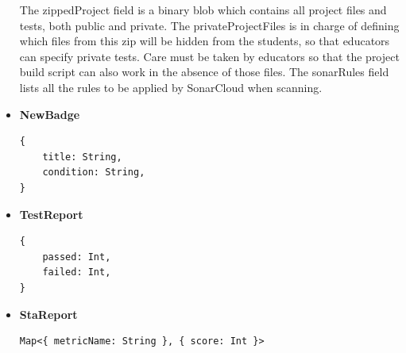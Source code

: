\begin{itemize}
          The zippedProject field is a binary blob which contains all project files and tests, both public and private.
          The privateProjectFiles is in charge of defining which files from this zip will be hidden from the students,
          so that educators can specify private tests. Care must be taken by educators so that the project build script
          can also work in the absence of those files. The sonarRules field lists all the rules to be applied by
          SonarCloud when scanning.
    \item \textbf{NewBadge}
          \begin{lstlisting}
{
    title: String,
    condition: String,
} 
          \end{lstlisting}
    \item \textbf{TestReport}
          \begin{lstlisting}
{
    passed: Int,
    failed: Int,
} 
          \end{lstlisting}
    \item \textbf{StaReport}
          \begin{lstlisting}
Map<{ metricName: String }, { score: Int }> 
          \end{lstlisting}
\end{itemize}

